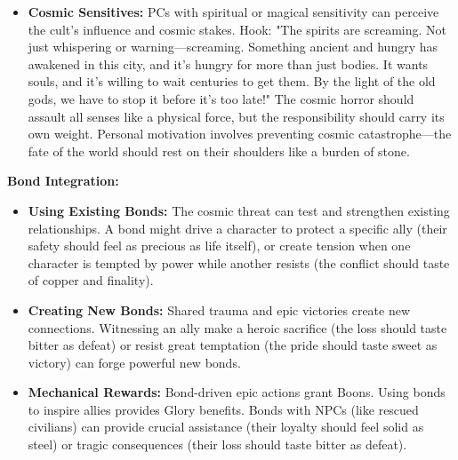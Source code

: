 \documentclass[11pt]{article}
\begin{document}
\begin{itemize}
\item \textbf{Cosmic Sensitives:} PCs with spiritual or magical sensitivity can perceive the cult's influence and cosmic stakes. Hook: "The spirits are screaming. Not just whispering or warning—screaming. Something ancient and hungry has awakened in this city, and it's hungry for more than just bodies. It wants souls, and it's willing to wait centuries to get them. By the light of the old gods, we have to stop it before it's too late!" The cosmic horror should assault all senses like a physical force, but the responsibility should carry its own weight. Personal motivation involves preventing cosmic catastrophe—the fate of the world should rest on their shoulders like a burden of stone.
\end{itemize}

\textbf{Bond Integration:}
\begin{itemize}
\item \textbf{Using Existing Bonds:} The cosmic threat can test and strengthen existing relationships. A bond might drive a character to protect a specific ally (their safety should feel as precious as life itself), or create tension when one character is tempted by power while another resists (the conflict should taste of copper and finality).
\item \textbf{Creating New Bonds:} Shared trauma and epic victories create new connections. Witnessing an ally make a heroic sacrifice (the loss should taste bitter as defeat) or resist great temptation (the pride should taste sweet as victory) can forge powerful new bonds.
\item \textbf{Mechanical Rewards:} Bond-driven epic actions grant Boons. Using bonds to inspire allies provides Glory benefits. Bonds with NPCs (like rescued civilians) can provide crucial assistance (their loyalty should feel solid as steel) or tragic consequences (their loss should taste bitter as defeat).
\end{itemize}
\end{document}
